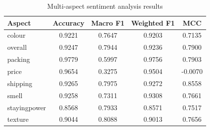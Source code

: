 \begin{table}[h]
\centering
\begin{tabular}{lcccc}
\hline
Aspect & Accuracy & Macro F1 & Weighted F1 & MCC \\
\hline
colour & 0.9221 & 0.7647 & 0.9203 & 0.7135 \\
overall & 0.9247 & 0.7944 & 0.9236 & 0.7900 \\
packing & 0.9779 & 0.5997 & 0.9756 & 0.7903 \\
price & 0.9654 & 0.3275 & 0.9504 & -0.0070 \\
shipping & 0.9265 & 0.7975 & 0.9272 & 0.8558 \\
smell & 0.9258 & 0.7311 & 0.9308 & 0.7661 \\
stayingpower & 0.8568 & 0.7933 & 0.8571 & 0.7517 \\
texture & 0.9044 & 0.8088 & 0.9013 & 0.7656 \\
\hline
\end{tabular}
\caption{Multi-aspect sentiment analysis results}
\label{tab:results}
\end{table}